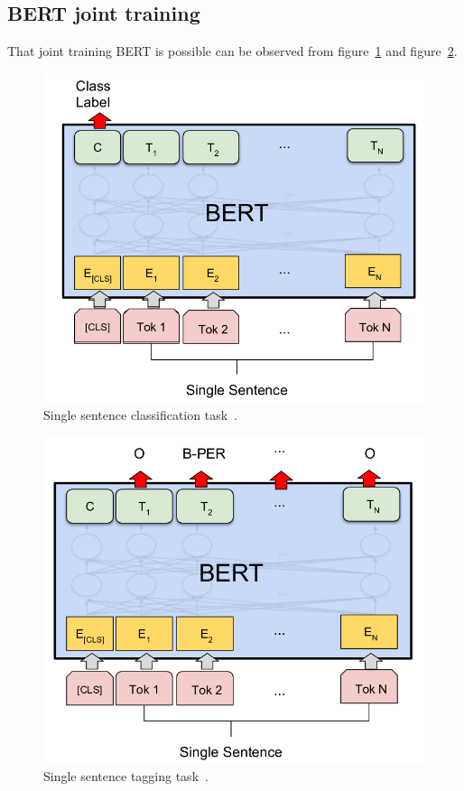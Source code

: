 \subsection{BERT joint training}
\label{subsec:bert_joint_training}
That joint training BERT is possible can be observed from figure~\ref{fig:bert_single_sentence} and figure~\ref{fig:bert_ner}.
\begin{figure}[htbp]
    \begin{center}
        \includegraphics[scale=0.3]{figures/bert_single_sentence.png}
    \end{center}
    \caption{Single sentence classification task~\cite[Figure 3]{devlin2018}.}
    \label{fig:bert_single_sentence}
\end{figure}

\begin{figure}[htbp]
    \begin{center}
        \includegraphics[scale=0.3]{figures/bert_ner.png}
    \end{center}
    \caption{Single sentence tagging task~\cite[Figure 3]{devlin2018}.}
    \label{fig:bert_ner}
\end{figure}

